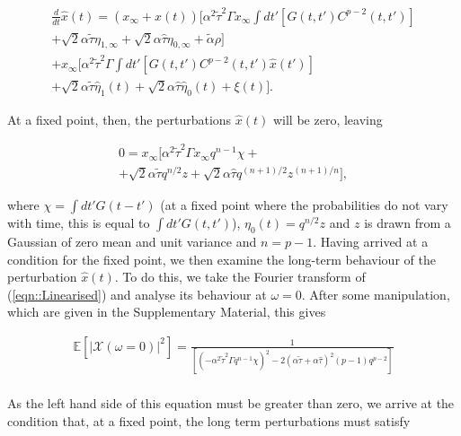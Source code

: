 \documentclass[sigconf,anonymous]{aamas}
\newcommand{\talpha}{\tilde{\alpha}}
\newcommand{\ttau}{\tilde{\tau}}
\newcommand{\htau}{\hat{\tau}}
\newcommand{\xfixed}{x_\infty}
\newcommand{\ezerof}{\eta_{0, \infty}}
\newcommand{\eonef}{\eta_{1, \infty}}
\newcommand{\xpert}{\hat{x}(t)}
\newcommand{\xpertdash}{\hat{x}(t')}
\newcommand{\ezeropert}{\hat{\eta}_0(t)}
\newcommand{\eonepert}{\hat{\eta}_1(t)}
\begin{document}
\begin{equation}
\label{eqn::Linearised}
    \begin{split}
        \frac{d}{dt} \xpert = (\xfixed + \xpert) [ \alpha^2 \ttau^2 \Gamma \xfixed \int dt' [ G(t, t')C^{p - 2}(t, t') ]\\ + \sqrt{2} \alpha \ttau \eonef + \sqrt{2} \alpha \htau \ezerof + \talpha \rho] \\
        + \xfixed [\alpha^2 \ttau^2 \Gamma \int dt' [ G(t, t')C^{p - 2}(t, t') \xpertdash ] \\ + \sqrt{2} \alpha \ttau \eonepert + \sqrt{2} \alpha \htau \ezeropert + \xi(t)].
    \end{split}
\end{equation}

At a fixed point, then, the perturbations $\xpert$ will be zero, leaving

\begin{equation}
    \begin{split}
    \label{eqn::fixed_point}
        0 = \xfixed [ \alpha^2 \ttau^2 \Gamma \xfixed q^{n-1} \chi + \\ + \sqrt{2} \alpha \ttau q^{n/2}z + \sqrt{2} \alpha \htau q^{(n+1)/2} z^{(n+1)/n}],
    \end{split}
\end{equation}

where $\chi = \int dt' G(t - t')$ (at a fixed point where the probabilities do not vary with time, this is equal to $\int dt' G(t, t')$), $\eta_0(t) = q^{n/2}z$ and $z$ is drawn from a Gaussian of zero mean and unit variance and $n = p - 1$. Having arrived at a condition for the fixed point, we then examine the long-term behaviour of the perturbation $\xpert$. To do this, we take the Fourier transform of (\ref{eqn::Linearised}) and analyse its behaviour at $\omega = 0$. After some manipulation, which are given in the Supplementary Material, this gives

\begin{equation}
\begin{split}
        \mathbb{E}[|\mathcal{X}(\omega = 0)|^2] = \frac{1}{\left[ (-\alpha^2 \ttau^2 \Gamma q^{n-1} \chi)^2 - 2 (\alpha \ttau + \alpha \htau)^2 (p-1)q^{p-2}\right]} \\
\end{split}
\end{equation}

As the left hand side of this equation must be greater than zero, we arrive at the condition that, at a fixed point, the long term perturbations must satisfy
\end{document}
